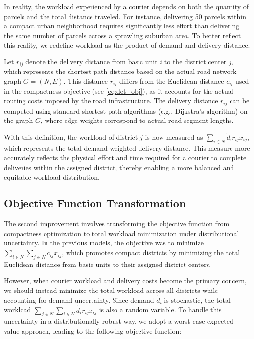 \documentclass[preprint,12pt,authoryear]{elsarticle}
\begin{document}
In reality, the workload experienced by a courier depends on both the quantity of parcels and the total distance traveled. For instance, delivering 50 parcels within a compact urban neighborhood requires significantly less effort than delivering the same number of parcels across a sprawling suburban area. To better reflect this reality, we redefine workload as the product of demand and delivery distance.

Let $r_{ij}$ denote the delivery distance from basic unit $i$ to the district center $j$, which represents the shortest path distance based on the actual road network graph $G = (N, E)$. This distance $r_{ij}$ differs from the Euclidean distance $c_{ij}$ used in the compactness objective (see \eqref{eq:det_obj}), as it accounts for the actual routing costs imposed by the road infrastructure. The delivery distance $r_{ij}$ can be computed using standard shortest path algorithms (e.g., Dijkstra's algorithm) on the graph $G$, where edge weights correspond to actual road segment lengths.

With this definition, the workload of district $j$ is now measured as $\sum_{i \in N} \widetilde{d}_i r_{ij} x_{ij}$, which represents the total demand-weighted delivery distance. This measure more accurately reflects the physical effort and time required for a courier to complete deliveries within the assigned district, thereby enabling a more balanced and equitable workload distribution.

\subsection{Objective Function Transformation}

The second improvement involves transforming the objective function from compactness optimization to total workload minimization under distributional uncertainty. In the previous models, the objective was to minimize $\sum_{i \in N} \sum_{j \in N} c_{ij} x_{ij}$, which promotes compact districts by minimizing the total Euclidean distance from basic units to their assigned district centers.

However, when courier workload and delivery costs become the primary concern, we should instead minimize the total workload across all districts while accounting for demand uncertainty. Since demand $\widetilde{d}_i$ is stochastic, the total workload $\sum_{j \in N} \sum_{i \in N} \widetilde{d}_i r_{ij} x_{ij}$ is also a random variable. To handle this uncertainty in a distributionally robust way, we adopt a worst-case expected value approach, leading to the following objective function:
\end{document}
